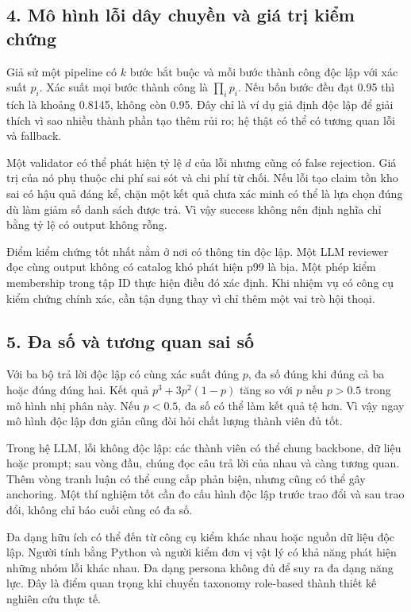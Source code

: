 \subsection{4. Mô hình lỗi dây chuyền và giá trị kiểm
chứng}\label{muxf4-huxecnh-lux1ed7i-duxe2y-chuyux1ec1n-vuxe0-giuxe1-trux1ecb-kiux1ec3m-chux1ee9ng}

Giả sử một pipeline có \(k\) bước bắt buộc và mỗi bước thành công độc
lập với xác suất \(p_i\). Xác suất mọi bước thành công là
\(\prod_i p_i\). Nếu bốn bước đều đạt 0.95 thì tích là khoảng 0.8145,
không còn 0.95. Đây chỉ là ví dụ giả định độc lập để giải thích vì sao
nhiều thành phần tạo thêm rủi ro; hệ thật có thể có tương quan lỗi và
fallback.

Một validator có thể phát hiện tỷ lệ \(d\) của lỗi nhưng cũng có false
rejection. Giá trị của nó phụ thuộc chi phí sai sót và chi phí từ chối.
Nếu lỗi tạo claim tồn kho sai có hậu quả đáng kể, chặn một kết quả chưa
xác minh có thể là lựa chọn đúng dù làm giảm số danh sách được trả. Vì
vậy success không nên định nghĩa chỉ bằng tỷ lệ có output không rỗng.

Điểm kiểm chứng tốt nhất nằm ở nơi có thông tin độc lập. Một LLM
reviewer đọc cùng output không có catalog khó phát hiện p99 là bịa. Một
phép kiểm membership trong tập ID thực hiện điều đó xác định. Khi nhiệm
vụ có công cụ kiểm chứng chính xác, cần tận dụng thay vì chỉ thêm một
vai trò hội thoại.

\subsection{5. Đa số và tương quan sai
số}\label{ux111a-sux1ed1-vuxe0-tux1b0ux1a1ng-quan-sai-sux1ed1}

Với ba bộ trả lời độc lập có cùng xác suất đúng \(p\), đa số đúng khi
đúng cả ba hoặc đúng đúng hai. Kết quả \(p^3+3p^2(1-p)\) tăng so với
\(p\) nếu \(p>0.5\) trong mô hình nhị phân này. Nếu \(p<0.5\), đa số có
thể làm kết quả tệ hơn. Vì vậy ngay mô hình độc lập đơn giản cũng đòi
hỏi chất lượng thành viên đủ tốt.

Trong hệ LLM, lỗi không độc lập: các thành viên có thể chung backbone,
dữ liệu hoặc prompt; sau vòng đầu, chúng đọc câu trả lời của nhau và
càng tương quan. Thêm vòng tranh luận có thể cung cấp phản biện, nhưng
cũng có thể gây anchoring. Một thí nghiệm tốt cần đo cấu hình độc lập
trước trao đổi và sau trao đổi, không chỉ báo cuối cùng có đa số.

Đa dạng hữu ích có thể đến từ công cụ kiểm khác nhau hoặc nguồn dữ liệu
độc lập. Người tính bằng Python và người kiểm đơn vị vật lý có khả năng
phát hiện những nhóm lỗi khác nhau. Đa dạng persona không đủ để suy ra
đa dạng năng lực. Đây là điểm quan trọng khi chuyển taxonomy role-based
thành thiết kế nghiên cứu thực tế.

